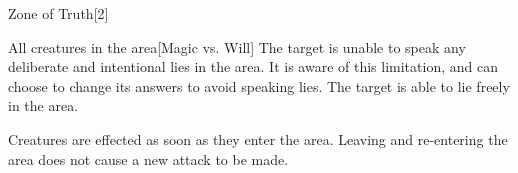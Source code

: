 \begin{spellsection}{Zone of Truth}[2]
    \begin{spellheader}
    \end{spellheader}
    \begin{spellcontent}
        \begin{spelltargetinginfo}
        \end{spelltargetinginfo}
        \begin{spelleffects}

            \begin{spelltargets}{All creatures in the area}[Magic vs. Will]
                \spellsuccess The target is unable to speak any deliberate and intentional lies in the area. It is aware of this limitation, and can choose to change its answers to avoid speaking lies.
                \spellfailure The target is able to lie freely in the area.
            \end{spelltargets}
            \spelldur \durmed
        \end{spelleffects}
    \end{spellcontent}
    \begin{spellfooter}
        \spellnotes Creatures are effected as soon as they enter the area. Leaving and re-entering the area does not cause a new attack to be made.
    \end{spellfooter}
\end{spellsection}
